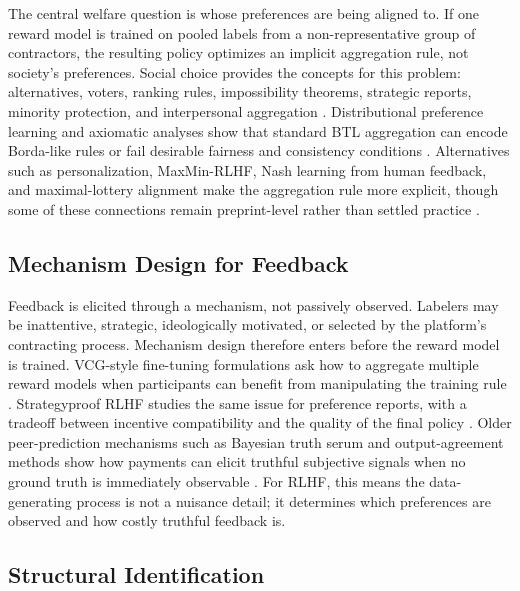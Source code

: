 The central welfare question is whose preferences are being aligned to. If one reward model is trained on pooled labels from a non-representative group of contractors, the resulting policy optimizes an implicit aggregation rule, not society's preferences. Social choice provides the concepts for this problem: alternatives, voters, ranking rules, impossibility theorems, strategic reports, minority protection, and interpersonal aggregation \citep{conitzer2024socialchoice,mishra2023socialchoice}. Distributional preference learning and axiomatic analyses show that standard BTL aggregation can encode Borda-like rules or fail desirable fairness and consistency conditions \citep{siththaranjan2024distributional,ge2024axioms}. Alternatives such as personalization, MaxMin-RLHF, Nash learning from human feedback, and maximal-lottery alignment make the aggregation rule more explicit, though some of these connections remain preprint-level rather than settled practice \citep{park2024heterogeneous,chakraborty2024maxmin,munos2023nash,maurarivero2025maximal}.

\subsection{Mechanism Design for Feedback}

Feedback is elicited through a mechanism, not passively observed. Labelers may be inattentive, strategic, ideologically motivated, or selected by the platform's contracting process. Mechanism design therefore enters before the reward model is trained. VCG-style fine-tuning formulations ask how to aggregate multiple reward models when participants can benefit from manipulating the training rule \citep{sun2024mechanism}. Strategyproof RLHF studies the same issue for preference reports, with a tradeoff between incentive compatibility and the quality of the final policy \citep{kleinebuening2025strategyproof}. Older peer-prediction mechanisms such as Bayesian truth serum and output-agreement methods show how payments can elicit truthful subjective signals when no ground truth is immediately observable \citep{prelec2004bayesian,miller2005eliciting}. For RLHF, this means the data-generating process is not a nuisance detail; it determines which preferences are observed and how costly truthful feedback is.

\subsection{Structural Identification}

